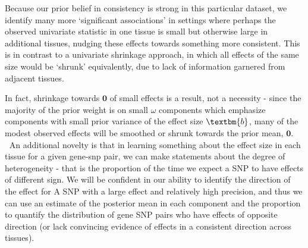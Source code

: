 Because our prior belief in consistency is strong in this particular dataset, we identify many more `significant associations'  in settings where perhaps the observed univariate statistic in one tissue is small but otherwise large in additional tissues, nudging these effects towards something more consistent. This is in contrast to a univariate shrinkage approach, in which all effects of the same size would be `shrunk' equivalently, due to lack of information garnered from adjacent tissues. 

In fact, shrinkage towards $\bm{0}$ of small effects is a result, not a necessity - since the majority of the prior weight is on small $\omega$ components which emphasize components with small prior variance of the effect size $\textbm{b}$, many of the modest observed effects will be smoothed or shrunk towards the prior mean, $\bm{0}$. 
An additional novelty is that in learning something about the effect size in each tissue for a given gene-snp pair, we can make statements about the degree of heterogeneity - that is the proportion of the time we expect a SNP to have effects of different sign. We will be confident in our ability to identify the direction of the effect for A SNP with a large effect and relatively high precision, and thus we can use an estimate of the posterior mean in each component and the proportion to quantify the distribution of gene SNP pairs who have effects of opposite direction (or lack convincing evidence of effects in a consistent direction across tissues).
